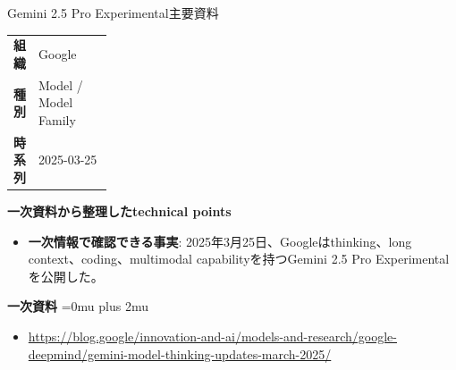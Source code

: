 \begin{technicalnote}{Gemini 2.5 Pro Experimental}{主要資料}
\begingroup
\begin{tabularx}{\linewidth}{@{}>{\bfseries}p{0.22\linewidth}X@{}}
組織 & Google \\
種別 & Model / Model Family \\
時系列 & 2025-03-25 \\
\end{tabularx}
\smallskip
\begin{minipage}{\linewidth}
{\bfseries 一次資料から整理したtechnical points}
\begin{itemize}[leftmargin=1.5em,itemsep=0.35em]
\item \textbf{一次情報で確認できる事実}: 2025年3月25日、Googleはthinking、long context、coding、multimodal capabilityを持つGemini 2.5 Pro Experimentalを公開した。
\end{itemize}
\begin{samepage}
{\bfseries 一次資料}
\begingroup\sloppy
\Urlmuskip=0mu plus 2mu\relax
\begin{itemize}[leftmargin=1.5em,itemsep=0.25em]
\item {\scriptsize\url{https://blog.google/innovation-and-ai/models-and-research/google-deepmind/gemini-model-thinking-updates-march-2025/}}
\end{itemize}
\endgroup
\end{samepage}
\end{minipage}
\endgroup
\end{technicalnote}
\medskip


